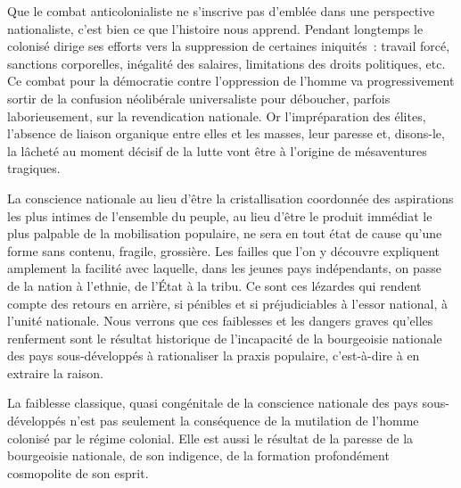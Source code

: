 \documentclass[french,twoside]{book} %
\newcommand\chaptercont{} %
\begin{document}
 
\chaptercont
\noindent Que le combat anticolonialiste ne s’inscrive pas d’emblée dans une perspective nationaliste, c’est bien ce que l’histoire nous apprend. Pendant longtemps le colonisé dirige ses efforts vers la suppression de certaines iniquités : travail forcé, sanctions corporelles, inégalité des salaires, limitations des droits politiques, etc. Ce combat pour la démocratie contre l’oppression de l’homme va progressivement sortir de la confusion néolibérale universaliste pour déboucher, parfois laborieusement, sur la revendication nationale. Or l’impréparation des élites, l’absence de liaison organique entre elles et les masses, leur paresse et, disons-le, la lâcheté au moment décisif de la lutte vont être à l’origine de mésaventures tragiques.\par
\bigbreak
\noindent La conscience nationale au lieu d’être la cristallisation coordonnée des aspirations les plus intimes de l’ensemble du peuple, au lieu d’être le produit immédiat le plus palpable de la mobilisation populaire, ne sera en tout état de cause qu’une forme sans contenu, fragile, grossière. Les failles que l’on y découvre expliquent amplement la facilité avec laquelle, dans les jeunes pays indépendants, on passe de la nation à l’ethnie, de l’État à la tribu. Ce sont ces lézardes qui rendent compte des retours en arrière, si pénibles et si préjudiciables à l’essor national, à l’unité nationale. Nous verrons que ces faiblesses et les dangers graves qu’elles renferment sont le résultat historique de l’incapacité de la bourgeoisie nationale des pays sous-développés à rationaliser la praxis populaire, c’est-à-dire à en extraire la raison.\par
La faiblesse classique, quasi congénitale de la conscience nationale des pays sous-développés n’est pas seulement la   conséquence de la mutilation de l’homme colonisé par le régime colonial. Elle est aussi le résultat de la paresse de la bourgeoisie nationale, de son indigence, de la formation profondément cosmopolite de son esprit.\par
\bigbreak
\end{document}
